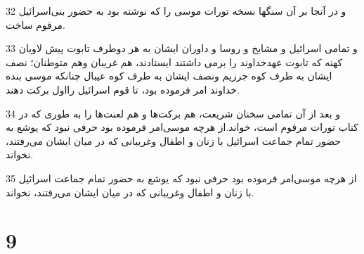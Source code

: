 \par 32 و در آنجا بر آن سنگها نسخه تورات موسی را که نوشته بود به حضور بنی‌اسرائیل مرقوم ساخت.
\par 33 و تمامی اسرائیل و مشایخ و روسا و داوران ایشان به هر دوطرف تابوت پیش لاویان کهنه که تابوت عهدخداوند را برمی داشتند ایستادند، هم غریبان وهم متوطنان؛ نصف ایشان به طرف کوه جرزیم ونصف ایشان به طرف کوه عیبال چنانکه موسی بنده خداوند امر فرموده بود، تا قوم اسرائیل رااول برکت دهند.
\par 34 و بعد از آن تمامی سخنان شریعت، هم برکت‌ها و هم لعنت‌ها را به طوری که در کتاب تورات مرقوم است، خواند.از هرچه موسی‌امر فرموده بود حرفی نبود که یوشع به حضور تمام جماعت اسرائیل با زنان و اطفال وغریبانی که در میان ایشان می‌رفتند، نخواند.
\par 35 از هرچه موسی‌امر فرموده بود حرفی نبود که یوشع به حضور تمام جماعت اسرائیل با زنان و اطفال وغریبانی که در میان ایشان می‌رفتند، نخواند.
 
\chapter{9}


